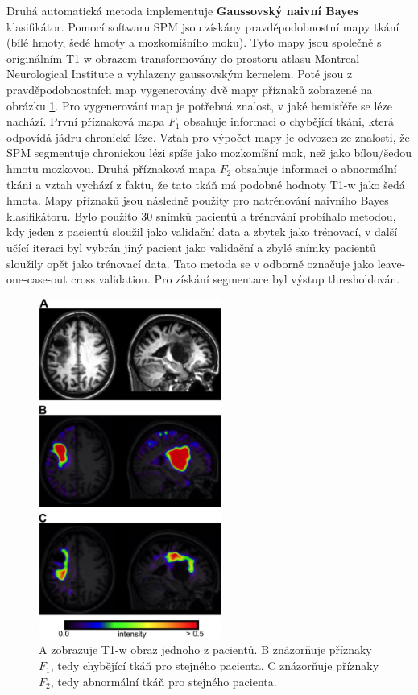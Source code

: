 \documentclass[11pt]{article}
\begin{document}
Druhá automatická metoda \cite{gnb} implementuje \alert{\textbf{Gaussovský naivní Bayes}} klasifikátor. Pomocí softwaru SPM jsou získány pravděpodobnostní mapy tkání (bílé hmoty, šedé hmoty a mozkomíšního moku). Tyto mapy jsou společně s originálním T1-w obrazem transformovány do prostoru atlasu Montreal Neurological Institute a vyhlazeny gaussovským kernelem. Poté jsou z pravděpodobnostních map vygenerovány dvě mapy příznaků zobrazené na obrázku \ref{img-gnb_features}. Pro vygenerování map je potřebná znalost, v jaké hemisféře se léze nachází. První příznaková mapa $F_1$ obsahuje informaci o chybějící tkáni, která odpovídá jádru chronické léze. Vztah pro výpočet mapy je odvozen ze znalosti, že SPM segmentuje chronickou lézi spíše jako mozkomíšní mok, než jako bílou/šedou hmotu mozkovou. Druhá příznaková mapa $F_2$ obsahuje informaci o abnormální tkáni a vztah vychází z faktu, že tato tkáň má podobné hodnoty T1-w jako šedá hmota. Mapy příznaků jsou následně použity pro natrénování naivního Bayes klasifikátoru. Bylo použito 30 snímků pacientů a trénování probíhalo metodou, kdy jeden z pacientů sloužil jako validační data a zbytek jako trénovací, v další učící iteraci byl vybrán jiný pacient jako validační a zbylé snímky pacientů sloužily opět jako trénovací data. Tato metoda se v odborně označuje jako leave-one-case-out cross validation. Pro získání segmentace byl výstup thresholdován.
\begin{figure}[htp]
	\centering
	\includegraphics[width=6cm]{gnb_features}
	\caption{A zobrazuje T1-w obraz jednoho z pacientů. B znázorňuje příznaky $F_1$, tedy chybějící tkáň pro stejného pacienta. C znázorňuje příznaky $F_2$, tedy abnormální tkáň pro stejného pacienta.}
	\label{img-gnb_features}
\end{figure}
\end{document}
